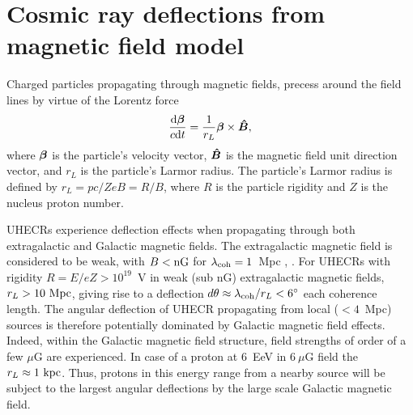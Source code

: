 \documentclass[usenatbib]{mnras}
\newcommand{\Andrew}[1]{\textcolor{dg}{#1}}
\newcommand{\Vasu}[1]{{\color{purple}#1}}
\newcommand{\bfm}[1]{\mbox{\boldmath$ #1 $}}
\begin{document}







\section{Cosmic ray deflections from magnetic field model}
\label{Deflections}

Charged particles propagating through magnetic fields, precess around the field lines by virtue of the Lorentz force 
\begin{eqnarray}
\frac{{\rm d}\bfm{\beta}}{c{\rm d}t} = \frac{1}{r_{L}}\bfm{\beta}\times \bfm{\hat{B}}, 
\end{eqnarray}
where $\bfm{\beta}$ is the particle's velocity vector, $\bfm{\hat{B}}$ is the magnetic field unit direction vector, and $r_{L}$ is the particle's Larmor radius. The particle's Larmor radius is defined by $r_{L}=pc/ZeB=R/B$, where $R$ is the particle rigidity and $Z$ is the nucleus proton number. 

UHECRs experience deflection effects when propagating through both extragalactic and Galactic magnetic fields. The extragalactic magnetic field is considered to be weak, with $B < \rm {nG}$ for $\lambda_{\rm coh}=1$~Mpc \cite{Blasi_1999}, \cite{Kronberg_2007}. For UHECRs with rigidity $R=E/eZ > 10^{19}$~V in weak (sub nG) extragalactic magnetic fields, $r_{L}>{\rm 10~Mpc}$, giving rise to a deflection $d\theta\approx \lambda_{\rm coh}/r_{L}<6^{\circ}$ each coherence length. The angular deflection of UHECR propagating from local ($<4$~Mpc) sources is therefore potentially dominated by Galactic magnetic field effects. Indeed, within the Galactic magnetic field structure, field strengths of order of a few $\mu$G are experienced. In case of a proton at 6~EeV in $6~\mu$G field the $r_L \approx 1 ~ \rm kpc$. Thus, protons in this energy range from a nearby source will be subject to the largest angular deflections by the large scale Galactic magnetic field. %
\end{document}
